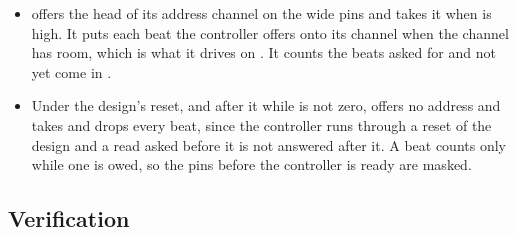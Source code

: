 \begin{itemize}
bursts in the order their addresses came. It takes the words when it
takes the address, as the 32-bit port does, and answers
; it does not read  or .
\item {} offers the head of its address channel on the
wide  pins and takes it when  is high. It puts
each beat the controller offers onto its  channel when the
channel has room, which is what it drives on . It counts
the beats asked for and not yet come in .
\item Under the design's reset, and after it while  is not
zero,  offers no address and takes and drops every beat,
since the controller runs through a reset of the design and a read
asked before it is not answered after it. A beat counts only while one
is owed, so the pins before the controller is ready are masked.
\end{itemize}

\subsection*{Verification}


